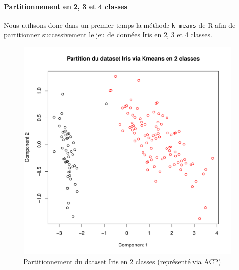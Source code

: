 \documentclass{report}
\begin{document}
\paragraph{Partitionnement en 2, 3 et 4 classes}
Nous utilisons donc dans un premier temps la méthode \verb+k-means+ de R afin de partitionner successivement le jeu de données Iris en 2, 3 et 4 classes.
\begin{figure}[ht!]
\begin{center}
    \includegraphics[width=\textwidth]{../plots/E3Q1_ki2.pdf}
    \caption{Partitionnement du dataset Iris en 2 classes (représenté via ACP)}
\end{center}
\end{figure}
\end{document}
